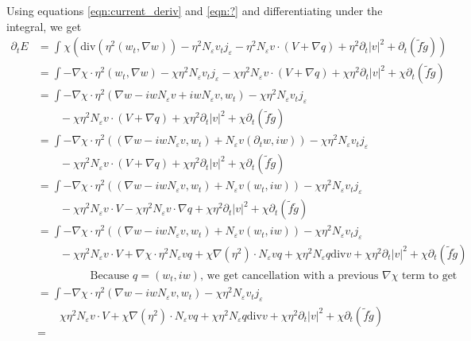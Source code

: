 \documentclass[a4paper]{article}
\renewcommand{\div}{\mathrm{div}}
\begin{document}
Using equations \eqref{eqn:current_deriv} and \eqref{eqn:?} and differentiating under the integral, we get
\begin{align}
  \partial_t E &= \int_{}^{} \chi \left( \div(\eta^2 (w_t, \nabla w)) - \eta^2 N_\varepsilon v_t j_\varepsilon - \eta^2 N_\varepsilon v \cdot (V + \nabla q) +
  \eta^2 \partial_t |v|^2 + \partial_t (\tilde{f} \tilde{g}) \right) \nonumber \\
  &= \int - \nabla \chi \cdot \eta^2 (w_t, \nabla w) - \chi \eta^2 N_\varepsilon v_t j_\varepsilon - \chi \eta^2 N_\varepsilon v \cdot (V + \nabla q) + \chi \eta^2
  \partial_t |v|^2 + \chi \partial_t (\tilde{f} \tilde{g}) \nonumber \\
  &= \int - \nabla \chi \cdot \eta^2 ( \nabla w - i w N_\varepsilon v + i w N_\varepsilon v, w_t) - \chi \eta^2 N_\varepsilon v_t j_\varepsilon
  \nonumber \\
  &\quad \quad - \chi \eta^2 N_\varepsilon v \cdot (V + \nabla q) + \chi \eta^2 \partial_t |v|^2 + \chi \partial_t(\tilde{f} \tilde{g}) \nonumber \\
  &= \int - \nabla \chi \cdot \eta^2 \left( (\nabla w - iw N_\varepsilon v, w_t) + N_\varepsilon v (\partial_t w, i w) \right) - \chi \eta^2
  N_\varepsilon v_t j_\varepsilon \nonumber \\
  &\quad \quad - \chi \eta^2 N_\varepsilon v \cdot (V+\nabla q) + \chi \eta^2 \partial_t |v|^2 + \chi \partial_t(\tilde{f} \tilde{g}) \nonumber \\
  &= \int - \nabla \chi \cdot \eta^2 ( (\nabla w - iw N_\varepsilon v, w_t) + N_\varepsilon v(w_t, iw) ) - \chi \eta^2 N_\varepsilon v_t j_\varepsilon
  \nonumber \\
  &\quad \quad - \chi \eta^2 N_\varepsilon v \cdot V - \chi \eta^2 N_\varepsilon v \cdot \nabla q + \chi \eta^2 \partial_t |v|^2 + \chi \partial_t( \tilde{f}
  \tilde{g}) \nonumber \\
  &= \int - \nabla \chi \cdot \eta^2 ( ( \nabla w - i w N_\varepsilon v, w_t) + N_\varepsilon v(w_t, iw) ) - \chi \eta^2 N_\varepsilon v_t
  j_\varepsilon \nonumber \\
  &\quad \quad - \chi \eta^2 N_\varepsilon v \cdot V + \nabla \chi \cdot \eta^2 N_\varepsilon v q + \chi \nabla(\eta^2) \cdot N_\varepsilon v q + \chi \eta^2 N_\varepsilon q \div v + \chi \eta^2
  \partial_t |v|^2 + \chi \partial_t (\tilde{f} \tilde{g}) \nonumber \\
  &\hspace{2cm} \text{Because } q = (w_t, iw) \text{, we get cancellation with a previous $\nabla \chi$ term to get} \nonumber \\
  &= \int - \nabla \chi \cdot \eta^2 ( \nabla w - iw N_\varepsilon v, w_t) - \chi \eta^2 N_\varepsilon v_t j_\varepsilon \nonumber \\
  &\quad \quad \chi \eta^2 N_\varepsilon v \cdot V + \chi \nabla(\eta^2) \cdot N_\varepsilon vq + \chi \eta^2 N_\varepsilon q \div v + \chi \eta^2
  \partial_t |v|^2 + \chi \partial_t (\tilde{f} \tilde{g}) \nonumber \\
  &=
  \label{eqn:energy_deriv}
\end{align}
\end{document}
